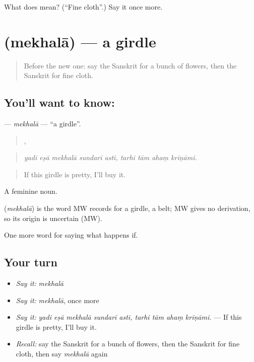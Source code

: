 \begin{tcolorbox}[breakable,colback=teal!4,colframe=teal!35!black,title={Before you move on}]
What does  mean? (\textquotedblleft{}Fine cloth\textquotedblright{}.) Say it once more.
\end{tcolorbox}
\section[\texorpdfstring{\sk{मेखला} (mekhalā)}{मेखला (mekhalā)}]{ (mekhalā) — a girdle}

\label{lesson:SA-C532-mekhala}



\begin{quote}
Before the new one: say the Sanskrit for a bunch of flowers, then the Sanskrit for fine cloth.
\end{quote}

\subsection*{You'll want to know: }
\textbf{} — \emph{mekhalā} — \textquotedblleft{}a girdle\textquotedblright{}.

\begin{quote}
    ,    
\end{quote}

\begin{quote}
\emph{yadi eṣā mekhalā sundarī asti, tarhi tām ahaṃ krīṇāmi.}
\end{quote}

\begin{quote}
If this girdle is pretty, I'll buy it.
\end{quote}

A feminine noun.

\begin{cousinweb}
\textbf{} (\emph{mekhalā}) is the word MW records for a girdle, a belt; MW gives no derivation, so its origin is uncertain (MW).
\end{cousinweb}

\begin{grammarlens}[title={What you've built}]
One more word for saying what happens if.
\end{grammarlens}

\subsection*{Your turn}
\begin{itemize}
\raggedright
  \item \emph{Say it:} \emph{mekhalā}
  \item \emph{Say it:} \emph{mekhalā}, once more
  \item \emph{Say it:} \emph{yadi eṣā mekhalā sundarī asti, tarhi tām ahaṃ krīṇāmi.} — If this girdle is pretty, I'll buy it.
  \item \emph{Recall:} say the Sanskrit for a bunch of flowers, then the Sanskrit for fine cloth, then say \emph{mekhalā} again
\end{itemize}

